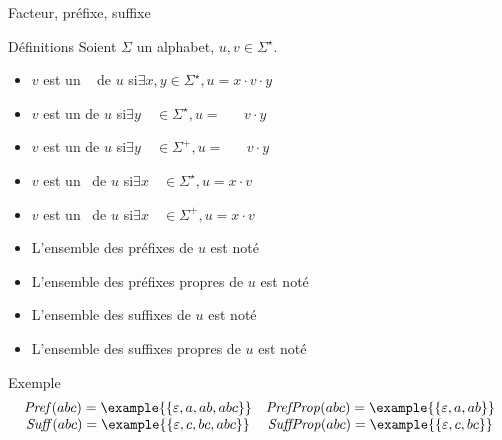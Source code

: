 
\begingroup

\begin{frame}{Facteur, préfixe, suffixe}
  
  \begin{block}{Définitions}
    Soient $\Sigma$ un alphabet, $u, v \in \Sigma^\star$.
    \begin{itemize}
    \item $v$ est un  \phantom{propr}\,\,\, de $u$ si\quad \alert{$\exists x, y           \in \Sigma^\star, u = x \cdot v \cdot y$}
    \item $v$ est un  \phantom{propre}      de $u$ si\quad \alert{$\exists y\phantom{, x} \in \Sigma^\star, u = \phantom {w \cdot }\; v \cdot y$}
    \item $v$ est un                 de $u$ si\quad \alert{$\exists y\phantom{, x} \in \Sigma^+,    u = \phantom{ w \cdot }\; v \cdot y$}
    \item $v$ est un  \phantom{propre}\,    de $u$ si\quad \alert{$\exists x\phantom{, y} \in \Sigma^\star, u = x \cdot v$}
    \item $v$ est un \,              de $u$ si\quad \alert{$\exists x\phantom{, y} \in \Sigma^+,    u = x \cdot v$}
      
    \item L'ensemble des préfixes de $u$ est noté 
    \item L'ensemble des préfixes propres de $u$ est noté 
    \item L'ensemble des suffixes de $u$ est noté 
    \item L'ensemble des suffixes propres de $u$ est noté 
    \end{itemize}
  \end{block}

  \begin{exampleblock}{Exemple}\vspace{-2mm}
    $$\begin{array}{cc}
    \mathit{Pref}(abc) = \example{\{\varepsilon, a, ab, abc\}} & \mathit{PrefProp}(abc) = \example{\{\varepsilon, a, ab\}}\\
    \mathit{Suff}(abc) = \example{\{\varepsilon, c, bc, abc\}} & \mathit{SuffProp}(abc) = \example{\{\varepsilon, c, bc\}}
    \end{array}$$
  \end{exampleblock}

\end{frame}

\endgroup
